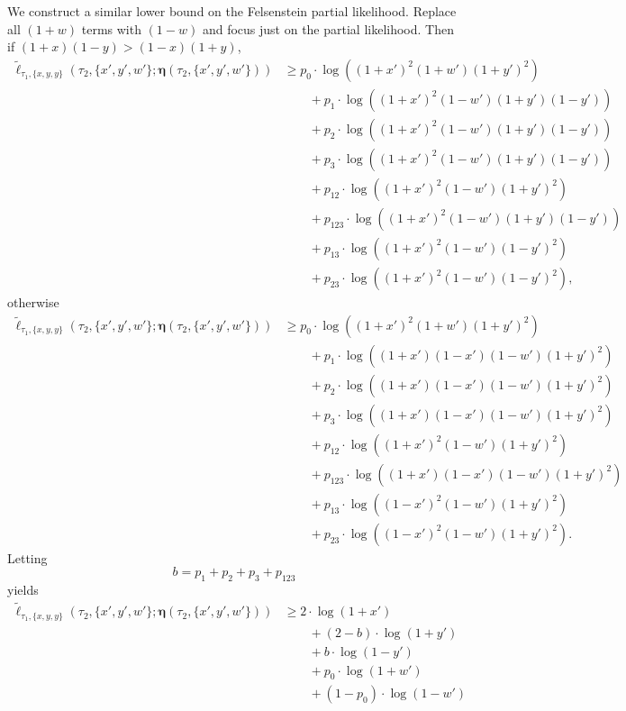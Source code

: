 \documentclass[a4paper]{article}
\newcommand{\fullAncestralSplitPartitions}{\boldsymbol\eta}
\begin{document}
We construct a similar lower bound on the Felsenstein partial likelihood.
Replace all $(1+w)$ terms with $(1-w)$ and focus just on the partial likelihood.
Then if $(1+x)(1-y) > (1-x)(1+y)$,
\begin{align*}
    \tilde{\ell}_{\tau_1,\{x,y,y\}}(\tau_2, \{x',y',w'\}; \fullAncestralSplitPartitions(\tau_2,\{x',y',w'\}))
    &\ge      p_{0}  \cdot\log((1+x')^2   (1+w')(1+y')^2) \\
    &\qquad + p_{1}  \cdot\log((1+x')^2   (1-w')(1+y')(1-y')) \\
    &\qquad + p_{2}  \cdot\log((1+x')^2   (1-w')(1+y')(1-y')) \\
    &\qquad + p_{3}  \cdot\log((1+x')^2   (1-w')(1+y')(1-y')) \\
    &\qquad + p_{12} \cdot\log((1+x')^2   (1-w')(1+y')^2) \\
    &\qquad + p_{123}\cdot\log((1+x')^2   (1-w')(1+y')(1-y'))\\
    &\qquad + p_{13} \cdot\log((1+x')^2   (1-w')(1-y')^2) \\
    &\qquad + p_{23} \cdot\log((1+x')^2   (1-w')(1-y')^2),
\end{align*}
otherwise
\begin{align*}
    \tilde{\ell}_{\tau_1,\{x,y,y\}}(\tau_2, \{x',y',w'\}; \fullAncestralSplitPartitions(\tau_2,\{x',y',w'\}))
    &\ge      p_{0}  \cdot\log((1+x')^2    (1+w')(1+y')^2) \\
    &\qquad + p_{1}  \cdot\log((1+x')(1-x')(1-w')(1+y')^2) \\
    &\qquad + p_{2}  \cdot\log((1+x')(1-x')(1-w')(1+y')^2) \\
    &\qquad + p_{3}  \cdot\log((1+x')(1-x')(1-w')(1+y')^2) \\
    &\qquad + p_{12} \cdot\log((1+x')^2    (1-w')(1+y')^2) \\
    &\qquad + p_{123}\cdot\log((1+x')(1-x')(1-w')(1+y')^2)\\
    &\qquad + p_{13} \cdot\log((1-x')^2    (1-w')(1+y')^2) \\
    &\qquad + p_{23} \cdot\log((1-x')^2    (1-w')(1+y')^2).
\end{align*}
Letting
$$
b = p_{1}+p_{2}+p_{3}+p_{123}
$$
yields
\begin{align*}
    \tilde{\ell}_{\tau_1,\{x,y,y\}}(\tau_2, \{x',y',w'\}; \fullAncestralSplitPartitions(\tau_2,\{x',y',w'\}))
    &\ge      2\cdot\log(1+x') \\
    &\qquad + (2-b)  \cdot\log(1+y') \\
    &\qquad + b      \cdot\log(1-y') \\
    &\qquad + p_{0}\cdot\log(1+w') \\
    &\qquad + (1-p_{0})\cdot\log(1-w')
\end{align*}
\end{document}
